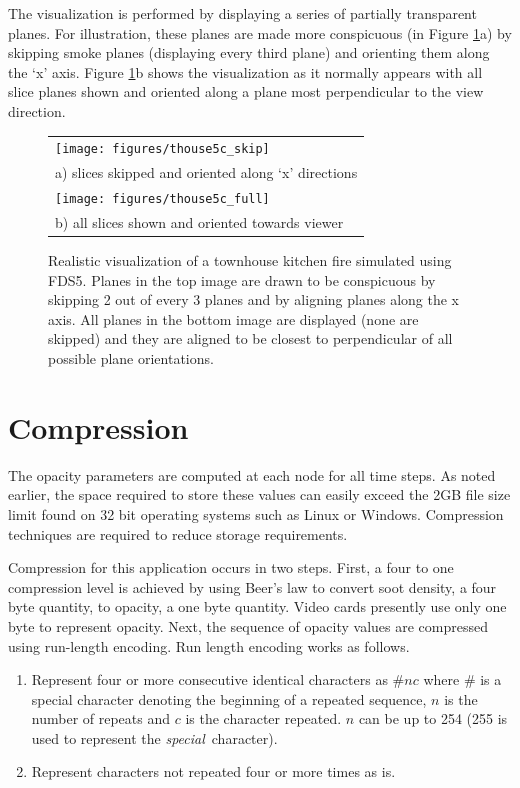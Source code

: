 \documentclass[11pt,twoside]{book}
\newcommand{\figoptions}{P}
\begin{document}
The visualization is performed by displaying a series of partially
transparent planes. For illustration, these planes are made more
conspicuous (in Figure \ref{figsmoke3d}a) by skipping smoke planes
(displaying every third plane) and orienting them along the `x'
axis. Figure \ref{figsmoke3d}b shows the visualization as it
normally appears with all slice planes shown and oriented along a
plane most perpendicular to the view direction.
\begin{figure}[\figoptions]
\begin{center}
\begin{tabular}{l}
\texttt{[image: figures/thouse5c\_skip]}\\
a) slices skipped and oriented along `x' directions\\
\texttt{[image: figures/thouse5c\_full]}\\
b) all slices shown and oriented towards viewer \\
\end{tabular}
\end{center}
\caption{Realistic visualization of a townhouse kitchen fire simulated
using FDS5. Planes in the top image are drawn to be conspicuous by
skipping 2 out of every 3 planes and by aligning planes along the
x axis. All planes in the bottom image are displayed (none are
skipped) and they are aligned to be closest to perpendicular of
all possible plane orientations.
  }
\label{figsmoke3d}%
\end{figure}

\chapter{Compression}

The opacity parameters are computed at each node for all time
steps. As noted earlier, the space required to store these values can easily exceed the 2GB file size limit found on 32
bit operating systems such as Linux or Windows.  Compression
techniques are required to reduce storage requirements.

Compression for this application occurs in two steps.  First, a four to one compression level is achieved by using Beer's
law to convert soot density, a four byte quantity, to opacity, a one byte quantity.  Video cards presently use only one byte to represent opacity.
Next, the sequence of opacity values are compressed using run-length encoding.
Run length encoding works as follows.

\begin{enumerate}
\item Represent four or more consecutive identical characters as $\# n c$
where $\#$ is a special character denoting the beginning of a
repeated sequence, $n$ is the number of repeats and $c$ is the
character repeated.  $n$ can be up to 254 (255 is used to represent the {\em special}\ character).
\item Represent characters not repeated four or more times as is.
\end{enumerate}
\end{document}
